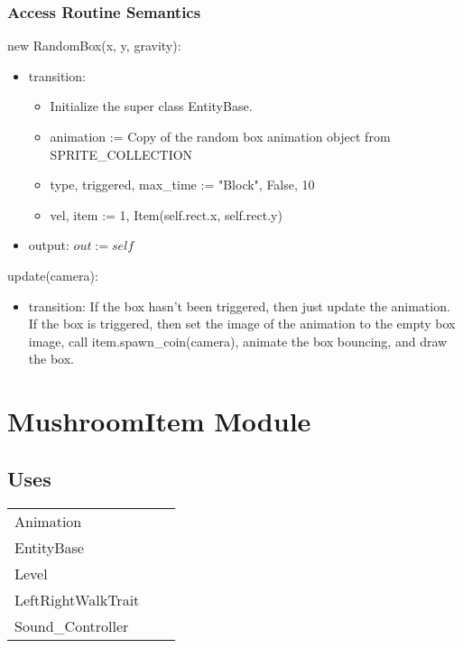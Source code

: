 \documentclass[12pt]{article}
\begin{document}
\subsubsection* {Access Routine Semantics}

new RandomBox(x, y, gravity):
\begin{itemize}
    \item transition: 
    \begin{itemize}[]
        \item Initialize the super class EntityBase.
        \item animation := Copy of the random box animation object from SPRITE\_COLLECTION
        \item type, triggered, max\_time := "Block", False, 10
        \item vel, item := 1, Item(self.rect.x, self.rect.y)
    \end{itemize}
    \item output: $out := self$
\end{itemize}


\noindent update(camera):
\begin{itemize}
    \item transition: If the box hasn't been triggered, then just update the animation. If the box is triggered, then set the image of the animation to the empty box image, call item.spawn\_coin(camera), animate the box bouncing, and draw the box. 
\end{itemize}

\newpage

\section*{MushroomItem Module}

\subsection* {Uses}

\begin{tabular}{lll}
    Animation & & \\
    EntityBase & & \\
    Level & & \\
    LeftRightWalkTrait & & \\
    Sound\_Controller & & \\
\end{tabular}
\end{document}
